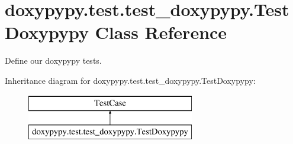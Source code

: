 \hypertarget{classdoxypypy_1_1test_1_1test__doxypypy_1_1_test_doxypypy}{\section{doxypypy.\-test.\-test\-\_\-doxypypy.\-Test\-Doxypypy Class Reference}
\label{classdoxypypy_1_1test_1_1test__doxypypy_1_1_test_doxypypy}
}


Define our doxypypy tests.  


Inheritance diagram for doxypypy.\-test.\-test\-\_\-doxypypy.\-Test\-Doxypypy\-:\begin{figure}[H]
\begin{center}
\leavevmode
\includegraphics[height=2.000000cm]{classdoxypypy_1_1test_1_1test__doxypypy_1_1_test_doxypypy}
\end{center}
\end{figure}
